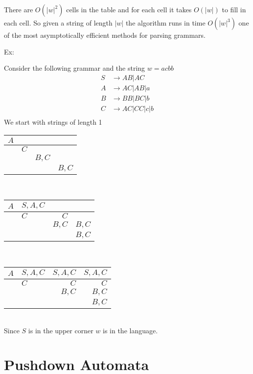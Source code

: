 \documentclass[11pt]{exam}
\begin{document}
There are $O(|w|^2)$ cells in the table and for each cell it takes $O(|w|)$ to fill in each cell. So given a string of length $|w|$ the algorithm runs in time $O(|w|^3)$ one of the most asymptotically efficient methods for parsing grammars.

Ex:
\begin{center}
Consider the following grammar and the string $w = acbb$
\begin{align*}
S &\rightarrow AB | AC\\
A &\rightarrow AC | AB | a\\
B &\rightarrow BB | BC | b\\
C &\rightarrow AC | CC | c | b\\
\end{align*}
We start with strings of length 1\\
\begin{tabular}{| l | l | r | r |}
\hline
$A$ &  & & \\ 
\hline
 & $C$ &  & \\
\hline 
 & & $B,C$ & \\
\hline 
 & & & $B,C$\\
\hline
\end{tabular}\\
\begin{tabular}{| l | l | r | r |}
\hline
$A$ & $S,A,C$ & & \\ 
\hline
 & $C$ & $C$  & \\
\hline 
 & & $B,C$ & $B,C$ \\
\hline 
 & & & $B,C$\\
\hline
\end{tabular}\\
\begin{tabular}{| l | l | r | r |}
\hline
$A$ & $S,A,C$ & $S,A,C$ & $S,A,C$ \\ 
\hline
 & $C$ & $C$  & $C$ \\
\hline 
 & & $B,C$ & $B,C$ \\
\hline 
 & & & $B,C$\\
\hline
\end{tabular}\\
Since $S$ is in the upper corner $w$ is in the language.
\end{center}

\newpage

\section{Pushdown Automata}
\end{document}
